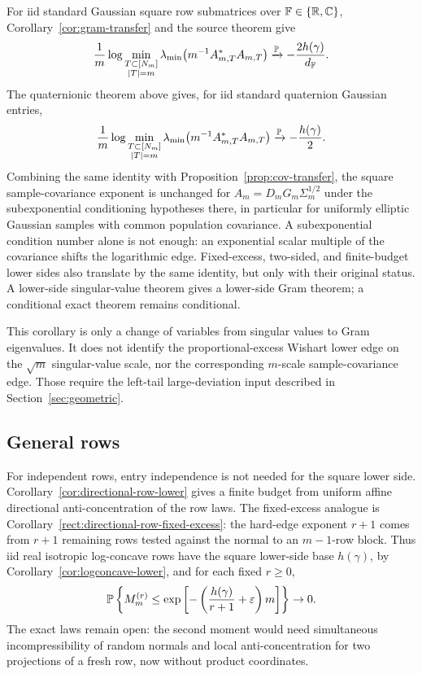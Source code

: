 For iid standard Gaussian square row submatrices over \(\mathbb{F}\in\{\mathbb{R},\mathbb{C}\}\),
Corollary~\ref{cor:gram-transfer} and the source theorem give
\[
  \frac1m\log
  \min_{\substack{T\subset[N_m]\\ |T|=m}}
  \lambda_{\min}\!\left(m^{-1}A_{m,T}^*A_{m,T}\right)
  \xrightarrow{\mathbb{P}}
  -\frac{2h(\gamma)}{d_{\mathbb{F}}}.
\]
The quaternionic theorem above gives, for iid standard quaternion Gaussian
entries,
\[
  \frac1m\log
  \min_{\substack{T\subset[N_m]\\ |T|=m}}
  \lambda_{\min}\!\left(m^{-1}A_{m,T}^*A_{m,T}\right)
  \xrightarrow{\mathbb{P}}
  -\frac{h(\gamma)}{2}.
\]
Combining the same identity with Proposition~\ref{prop:cov-transfer}, the
square sample-covariance exponent is unchanged for
\(A_m=D_mG_m\Sigma_m^{1/2}\) under the subexponential conditioning hypotheses
there, in particular for uniformly elliptic Gaussian samples with common
population covariance.  A subexponential condition number alone is not enough:
an exponential scalar multiple of the covariance shifts the logarithmic edge.
Fixed-excess, two-sided, and finite-budget lower sides also translate by the
same identity, but only with their original status.  A lower-side singular-value
theorem gives a lower-side Gram theorem; a conditional exact theorem remains
conditional.

\begin{remark}
This corollary is only a change of variables from singular values to Gram
eigenvalues.  It does not identify the proportional-excess Wishart lower edge
on the \(\sqrt m\) singular-value scale, nor the corresponding \(m\)-scale
sample-covariance edge.  Those require the left-tail large-deviation input
described in Section~\ref{sec:geometric}.
\end{remark}

\subsection{General rows}

For independent rows, entry independence is not needed for the square lower
side.  Corollary~\ref{cor:directional-row-lower} gives a finite budget from
uniform affine directional anti-concentration of the row laws.  The fixed-excess
analogue is Corollary~\ref{rect:directional-row-fixed-excess}: the hard-edge
exponent \(r+1\) comes from \(r+1\) remaining rows tested against the normal to
an \(m-1\)-row block.  Thus iid real isotropic log-concave rows have the square
lower-side base \(h(\gamma)\), by Corollary~\ref{cor:logconcave-lower}, and for
each fixed \(r\ge0\),
\[
  \mathbb{P}\left\{M_m^{(r)}
  \le \exp\left[-\left(\frac{h(\gamma)}{r+1}+\varepsilon\right)m\right]\right\}
  \to0 .
\]
The exact laws remain open: the second moment would need simultaneous
incompressibility of random normals and local anti-concentration for two
projections of a fresh row, now without product coordinates.


